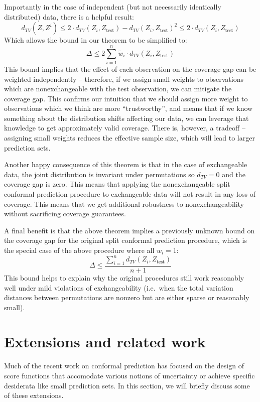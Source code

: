 \documentclass[a4paper, 12pt]{article}
\begin{document}
Importantly in the case of independent (but not necessarily identically distributed) data, there is a helpful result:
\[ d_{TV}(Z, Z^i) \leq 2 \cdot d_{TV}(Z_i, Z_{\text{test}}) - d_{TV}(Z_i, Z_{\text{test}})^2 \leq 2 \cdot d_{TV}(Z_i, Z_{\text{test}}) \]
Which allows the bound in our theorem to be simplified to:
\[\Delta \leq 2 \sum_{i=1}^n \tilde{w}_i \cdot d_{TV}(Z_i, Z_{\text{test}})\]
This bound implies that the effect of each observation on the coverage gap can be weighted independently -- therefore, if we assign small weights to observations which are nonexchangeable with the test observation, we can mitigate the coverage gap. This confirms our intuition that we should assign more weight to observations which we think are more ``trustworthy'', and means that if we know something about the distribution shifts affecting our data, we can leverage that knowledge to get approximately valid coverage. There is, however, a tradeoff -- assigning small weights reduces the effective sample size, which will lead to larger prediction sets.

Another happy consequence of this theorem is that in the case of exchangeable data, the joint distribution is invariant under permutations so $d_{TV}=0$ and the coverage gap is zero. This means that applying the nonexchangeable split conformal prediction procedure to exchangeable data will not result in any loss of coverage. This means that we get additional robustness to nonexchangeability without sacrificing coverage guarantees.

A final benefit is that the above theorem implies a previously unknown bound on the coverage gap for the original split conformal prediction procedure, which is the special case of the above procedure where all $w_i=1$:
\[\Delta \leq  \frac{\sum_{i=1}^n d_{TV}(Z_i, Z_{\text{test}})}{n+1}\]
This bound helps to explain why the original procedures still work reasonably well under mild violations of exchangeability (i.e.\ when the total variation distances between permutations are nonzero but are either sparse or reasonably small).


\section{Extensions and related work}
Much of the recent work on conformal prediction has focused on the design of score functions that accomodate various notions of uncertainty or achieve specific desiderata like small prediction sets. In this section, we will briefly discuss some of these extensions.
\end{document}
